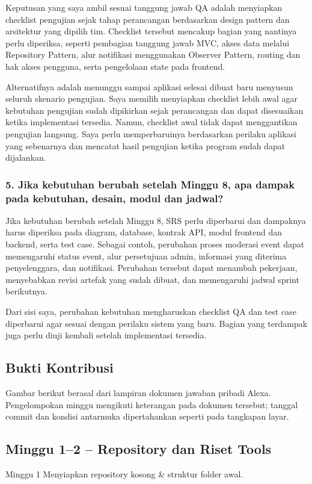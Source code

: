 \documentclass[11pt,a4paper]{article}
\begin{document}
Keputusan yang saya ambil sesuai tanggung jawab QA adalah menyiapkan checklist pengujian sejak tahap perancangan berdasarkan design pattern dan arsitektur yang dipilih tim. Checklist tersebut mencakup bagian yang nantinya perlu diperiksa, seperti pembagian tanggung jawab MVC, akses data melalui Repository Pattern, alur notifikasi menggunakan Observer Pattern, routing dan hak akses pengguna, serta pengelolaan state pada frontend.

Alternatifnya adalah menunggu sampai aplikasi selesai dibuat baru menyusun seluruh skenario pengujian. Saya memilih menyiapkan checklist lebih awal agar kebutuhan pengujian sudah dipikirkan sejak perancangan dan dapat disesuaikan ketika implementasi tersedia. Namun, checklist awal tidak dapat menggantikan pengujian langsung. Saya perlu memperbaruinya berdasarkan perilaku aplikasi yang sebenarnya dan mencatat hasil pengujian ketika program sudah dapat dijalankan.



\subsubsection*{5. Jika kebutuhan berubah setelah Minggu 8, apa dampak pada kebutuhan, desain, modul dan jadwal?}

Jika kebutuhan berubah setelah Minggu 8, SRS perlu diperbarui dan dampaknya harus diperiksa pada diagram, database, kontrak API, modul frontend dan backend, serta test case. Sebagai contoh, perubahan proses moderasi event dapat memengaruhi status event, alur persetujuan admin, informasi yang diterima penyelenggara, dan notifikasi. Perubahan tersebut dapat menambah pekerjaan, menyebabkan revisi artefak yang sudah dibuat, dan memengaruhi jadwal sprint berikutnya.

Dari sisi saya, perubahan kebutuhan mengharuskan checklist QA dan test case diperbarui agar sesuai dengan perilaku sistem yang baru. Bagian yang terdampak juga perlu diuji kembali setelah implementasi tersedia.


\endgroup
\clearpage\subsection*{Bukti Kontribusi}
Gambar berikut berasal dari lampiran dokumen jawaban pribadi Alexa. Pengelompokan minggu mengikuti keterangan pada dokumen tersebut; tanggal commit dan kondisi antarmuka dipertahankan seperti pada tangkapan layar.

\subsection*{Minggu 1--2 -- Repository dan Riset Tools}
Minggu 1 Menyiapkan repository kosong \& struktur folder awal.
\end{document}
